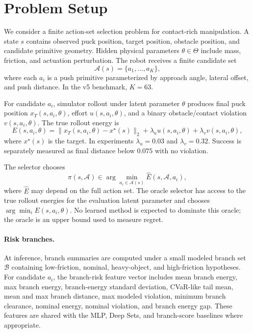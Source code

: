 \documentclass{article}
\newcommand{\actionset}{\mathcal{A}}
\newcommand{\latent}{\theta}
\newcommand{\energy}{E}
\begin{document}
\section{Problem Setup}

We consider a finite action-set selection problem for contact-rich manipulation.  A state $s$ contains observed puck position, target position, obstacle position, and candidate primitive geometry.  Hidden physical parameters $\latent \in \Theta$ include mass, friction, and actuation perturbation.  The robot receives a finite candidate set
\[
  \actionset(s) = \{a_1,\ldots,a_K\},
\]
where each $a_i$ is a push primitive parameterized by approach angle, lateral offset, and push distance.  In the v5 benchmark, $K=63$.

For candidate $a_i$, simulator rollout under latent parameter $\latent$ produces final puck position $x_T(s,a_i,\latent)$, effort $u(s,a_i,\latent)$, and a binary obstacle/contact violation $v(s,a_i,\latent)$.  The true rollout energy is
\[
  \energy(s,a_i,\latent)
  =
  \|x_T(s,a_i,\latent)-x^\star(s)\|_2
  + \lambda_u u(s,a_i,\latent)
  + \lambda_v v(s,a_i,\latent),
\]
where $x^\star(s)$ is the target.  In experiments $\lambda_u=0.03$ and $\lambda_v=0.32$.  Success is separately measured as final distance below $0.075$ with no violation.

The selector chooses
\[
  \pi(s,\actionset) \in \arg\min_{a_i \in \actionset(s)} \widehat{\energy}(s,\actionset,a_i),
\]
where $\widehat{\energy}$ may depend on the full action set.  The oracle selector has access to the true rollout energies for the evaluation latent parameter and chooses $\arg\min_i \energy(s,a_i,\latent)$.  No learned method is expected to dominate this oracle; the oracle is an upper bound used to measure regret.

\paragraph{Risk branches.}
At inference, branch summaries are computed under a small modeled branch set $\mathcal{B}$ containing low-friction, nominal, heavy-object, and high-friction hypotheses.  For candidate $a_i$, the branch-risk feature vector includes mean branch energy, max branch energy, branch-energy standard deviation, CVaR-like tail mean, mean and max branch distance, max modeled violation, minimum branch clearance, nominal energy, nominal violation, and branch energy gap.  These features are shared with the MLP, Deep Sets, and branch-score baselines where appropriate.
\end{document}
